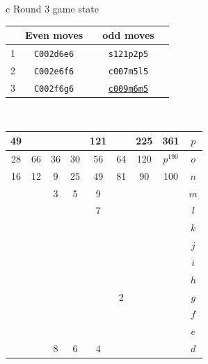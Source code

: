 \documentclass[12pt]{article}
\begin{document}
{\small{
\begin{tabular}{c}
Round 3 game state \\
\begin{tabular}{r|cc|cc}
& Even moves &     & odd moves &  \\    \hline  
1   &  {\tt C002d6e6} & \quad &  {\tt s121p2p5} & \quad \\
2   &  {\tt C002e6f6} & \quad &  {\tt c007m5l5} & \quad \\
3   &  {\tt C002f6g6} & \quad &  \underline{\tt c009m6m5} & \quad \\
\end{tabular}
\\
\begin{tabular}{|c|c|c|c|c|c|c|c||c} \hline
\squadfill{\,}49 & \quad & \quad & \quad & \squadfill{\,}121 & \quad & \squadfill{\,}225 & \squadfill{\,}361 & $p$ \\ \hline
\squadfill{\,}28 & \squadfill{\,}66 & \trianglepafill{\,}36 & \trianglepafill{\,}30 & \trianglepafill{\,}56 & \trianglepafill{\,}64 & \squadfill{\,}120 & \rhombusfill{\,}$p^{190}$ & $o$ \\ \hline
\trianglepafill{\,}16 & \trianglepafill{\,}12 & \circletfill{\,}9 & \circletfill{\,}25 & \circletfill{\,}49 & \circletfill{\,}81 & \trianglepafill{\,}90 & \trianglepafill{\,}100 & $n$ \\ \hline
\quad & \quad & \circletfill{\,}3 & \circletfill{\,}5 & \circletfill{\,}9 & \quad & \quad & \quad & $m$ \\ \hline
\quad & \quad & \quad & \quad & \circletfill{\,}7 & \quad & \quad & \quad & $l$ \\ \hline
\quad & \quad & \quad & \quad & \quad & \quad & \quad & \quad & $k$ \\ \hline
\quad & \quad & \quad & \quad & \quad & \quad & \quad & \quad & $j$ \\ \hline
\quad & \quad & \quad & \quad & \quad & \quad & \quad & \quad & $i$ \\ \hline
\quad & \quad & \quad & \quad & \quad & \quad & \quad & \quad & $h$ \\ \hline
\quad & \quad & \quad & \quad & \quad & \circlet{\,}2 & \quad & \quad & $g$ \\ \hline
\quad & \quad & \quad & \quad & \quad & \quad & \quad & \quad & $f$ \\ \hline
\quad & \quad & \quad & \quad & \quad & \quad & \quad & \quad & $e$ \\ \hline
\quad & \quad & \circlet{\,}8 & \circlet{\,}6 & \circlet{\,}4 & \quad & \quad & \quad & $d$ \\ \hline

\end{tabular}
\end{tabular}}}
\end{document}
